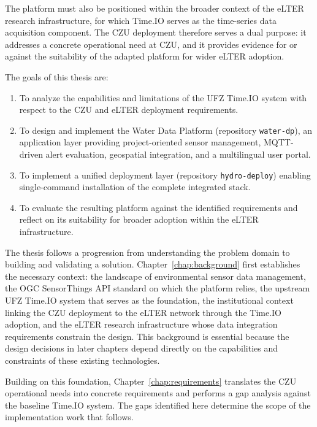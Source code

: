 The platform must also be positioned within the broader context of the eLTER research
infrastructure, for which Time.IO serves as the time-series data acquisition component.
The CZU deployment therefore serves a dual purpose: it addresses a concrete operational
need at CZU, and it provides evidence for or against the suitability of the adapted
platform for wider eLTER adoption.

\medskip\noindent
The goals of this thesis are:
\begin{enumerate}
  \item To analyze the capabilities and limitations of the UFZ Time.IO system with respect to the CZU and eLTER
        deployment requirements.
  \item To design and implement the Water Data Platform (repository \texttt{water-dp}),
        an application layer providing project-oriented sensor management,
        MQTT-driven alert evaluation, geospatial integration, and a multilingual user portal.
  \item To implement a unified deployment layer (repository \texttt{hydro-deploy})
        enabling single-command installation of the complete integrated stack.
  \item To evaluate the resulting platform against the identified requirements and reflect on its suitability for
        broader adoption within the eLTER infrastructure.
\end{enumerate}

\medskip\noindent
The thesis follows a progression from understanding the problem domain to building and validating a solution.
Chapter~\ref{chap:background} first establishes the necessary context: the landscape of environmental sensor data
management, the OGC SensorThings API standard on which the platform relies, the upstream UFZ Time.IO system that
serves as the foundation, the institutional context linking the CZU deployment to the eLTER network through the
Time.IO adoption, and the eLTER research infrastructure whose data integration requirements constrain the design. This background
is essential because the design decisions in later chapters depend directly on the capabilities and constraints of
these existing technologies.

Building on this foundation, Chapter~\ref{chap:requirements} translates the CZU operational needs into concrete
requirements and performs a gap analysis against the baseline Time.IO system. The gaps identified here determine
the scope of the implementation work that follows.

